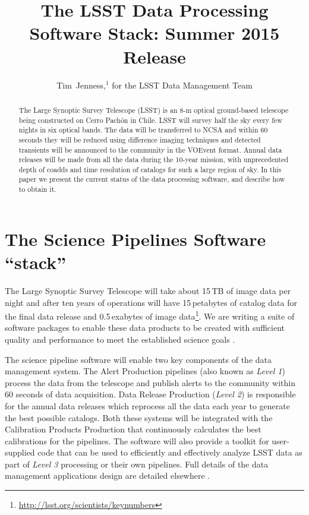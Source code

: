 \documentclass[11pt,twoside]{article}
\begin{document}
\title{The LSST Data Processing Software Stack: Summer 2015 Release}
\author{Tim~Jenness,$^1$ for the LSST Data Management Team
}


\begin{abstract}
  The Large Synoptic Survey Telescope (LSST) is an 8-m optical
  ground-based telescope being constructed on Cerro Pach\'on in
  Chile. LSST will survey half the sky every few nights in six optical
  bands. The data will be transferred to NCSA and within 60 seconds
  they will be reduced using difference imaging techniques and
  detected transients will be announced to the community in the
  VOEvent format. Annual data releases will be made from all the data
  during the 10-year mission, with unprecedented depth of coadds and
  time resolution of catalogs for such a large region of sky. In this
  paper we present the current status of the data processing software,
  and describe how to obtain it.
\end{abstract}

\section{The Science Pipelines Software ``stack''}

The Large Synoptic Survey Telescope
\citep[LSST;][]{2008arXiv0805.2366I} will take about 15\,TB of image
data per night and after ten years of operations will have
15\,petabytes of catalog data for the final data release and
0.5\,exabytes of image
data\footnote{\url{http://lsst.org/scientists/keynumbers}}. We are
writing a suite of software packages to enable these data products to
be created with sufficient quality and performance to meet the
established science goals \citep{2009arXiv0912.0201L}.

The science pipeline software will enable two key components of the data
management system. The Alert Production pipelines (also known as
\emph{Level 1}) process the data from the telescope and publish alerts
to the community within 60 seconds of data acquisition. Data Release
Production (\emph{Level 2}) is responsible for the annual data
releases which reprocess all the data each year to generate the best
possible catalogs. Both these systems will be integrated with the
Calibration Products Production that continuously calculates the best
calibrations for the pipelines. The software will also provide a toolkit
for user-supplied code that can be used to efficiently and effectively
analyze LSST data as part of \emph{Level 3} processing or their own
pipelines. Full details of the data management applications design are
detailed elsewhere \citep{O3-1_adassxxv,LDM-151}.
\end{document}
